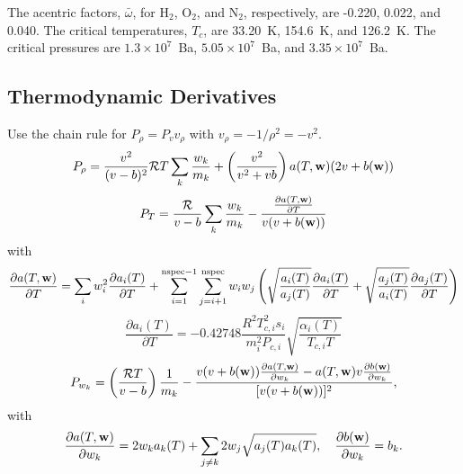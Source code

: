 \documentclass[final]{siamltex}
\def\wb {{\bf w}}
\begin{document}
The acentric factors, $\bar\omega$, for H$_2$, O$_2$, and N$_2$, respectively, 
are -0.220, 0.022, and 0.040.  The critical temperatures, $T_{c}$, are
33.20~K, 154.6~K, and 126.2~K.  The critical pressures are $1.3\times 10^7$~Ba,
$5.05\times 10^7$~Ba, and $3.35\times 10^7$~Ba.

\subsection{Thermodynamic Derivatives}
Use the chain rule for $P_\rho = P_v v_\rho$ with $v_\rho = -1/\rho^2 = -v^2$.
\begin{equation}
P_\rho = \frac{v^2}{(v-b)^2}\mathcal{R}T\sum_k\frac{w_k}{m_k} + \left(\frac{v^2}{v^2 + vb}\right)a(T,\wb)(2v+b(\wb))
\end{equation}
\begin{equation}
P_T = \frac{\mathcal{R}}{v-b}\sum_k\frac{w_k}{m_k} - \frac{\frac{\partial a(T,\wb)}{\partial T}}{v(v+b(\wb))}
\end{equation}
with
\begin{equation}
\frac{\partial a(T,\wb)}{\partial T} = \sum_i w_i^2 \frac{\partial a_i(T)}{\partial T}
+ \sum_{i=1}^{{\rm nspec}-1}\sum_{j=i+1}^{\rm nspec} w_i w_j\left(\sqrt{\frac{a_i(T)}{a_j(T)}}\frac{\partial a_i(T)}{\partial T} + \sqrt{\frac{a_j(T)}{a_i(T)}}\frac{\partial a_j(T)}{\partial T}\right)
\end{equation}
\begin{equation}
\frac{\partial a_i(T)}{\partial T} = -0.42748\frac{R^2T_{c,i}^2s_i}{m_i^2 P_{c,i}}\sqrt{\frac{\alpha_i(T)}{T_{c,i}T}}
\end{equation}
\begin{equation}
P_{w_k} = \left(\frac{\mathcal{R}T}{v-b}\right)\frac{1}{m_k}
- \frac{v(v+b(\wb))\frac{\partial a(T,\wb)}{\partial w_k} - a(T,\wb)v\frac{\partial b(\wb)}{\partial w_k}}{[v(v+b(\wb))]^2},
\end{equation}
with
\begin{equation}
\frac{\partial a(T,\wb)}{\partial w_k} = 2w_ka_k(T) + \sum_{j\ne k}2w_j\sqrt{a_j(T)a_k(T)},
\quad
\frac{\partial b(\wb)}{\partial w_k} = b_k.
\end{equation}
\end{document}
